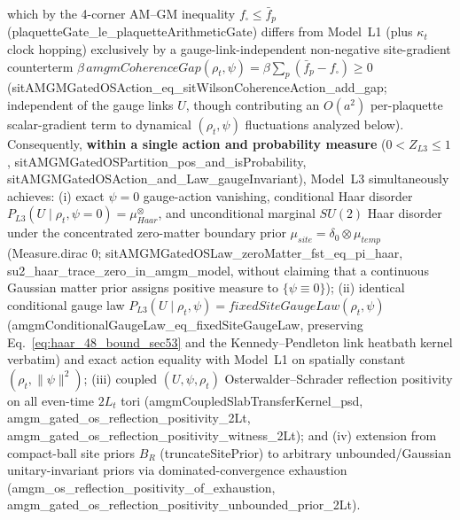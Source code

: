 \documentclass[american,11pt,letterpaper]{article}
\def\mathrm#1{#1}%
\def\texttt#1{#1}%
\begin{document}
\begin{enumerate}[leftmargin=2em]
  which by the 4-corner AM--GM inequality $f_\square \le \bar{f}_p$ (\texttt{plaquette\allowbreak{}Gate\_\allowbreak{}le\_\allowbreak{}plaquette\allowbreak{}Arithmetic\allowbreak{}Gate}) differs from Model~L1 (plus $\kappa_t$ clock hopping) exclusively by a gauge-link-independent non-negative site-gradient counterterm $\beta\,\mathrm{amgmCoherenceGap}(\rho_t,\psi) = \beta\sum_p(\bar{f}_p - f_\square) \ge 0$ (\texttt{sit\allowbreak{}AMGMGated\allowbreak{}OSAction\_\allowbreak{}eq\_\allowbreak{}sit\allowbreak{}Wilson\allowbreak{}Coherence\allowbreak{}Action\_\allowbreak{}add\_\allowbreak{}gap}; independent of the gauge links $U$, though contributing an $O(a^2)$ per-plaquette scalar-gradient term to dynamical $(\rho_t,\psi)$ fluctuations analyzed below). Consequently, \textbf{within a single action and probability measure} ($0 < Z_{\mathrm{L3}} \le 1$, \texttt{sit\allowbreak{}AMGMGated\allowbreak{}OSPartition\_\allowbreak{}pos\_\allowbreak{}and\_\allowbreak{}is\allowbreak{}Probability}, \texttt{sit\allowbreak{}AMGMGated\allowbreak{}OSAction\_\allowbreak{}and\_\allowbreak{}Law\_\allowbreak{}gauge\allowbreak{}Invariant}), Model~L3 simultaneously achieves: (i) exact $\psi = 0$ gauge-action vanishing, conditional Haar disorder $P_{\mathrm{L3}}(U\mid\rho_t,\psi=0) = \mu_{\mathrm{Haar}}^{\otimes}$, and unconditional marginal $SU(2)$ Haar disorder under the concentrated zero-matter boundary prior $\mu_{\mathrm{site}} = \delta_0 \otimes \mu_{\mathrm{temp}}$ (\texttt{Measure.dirac 0}; \texttt{sit\allowbreak{}AMGMGated\allowbreak{}OSLaw\_\allowbreak{}zero\allowbreak{}Matter\_\allowbreak{}fst\_\allowbreak{}eq\_\allowbreak{}pi\_\allowbreak{}haar}, \texttt{su2\_\allowbreak{}haar\_\allowbreak{}trace\_\allowbreak{}zero\_\allowbreak{}in\_\allowbreak{}amgm\_\allowbreak{}model}, without claiming that a continuous Gaussian matter prior assigns positive measure to $\{\psi \equiv 0\}$); (ii) identical conditional gauge law $P_{\mathrm{L3}}(U\mid\rho_t,\psi) = \mathrm{fixedSiteGaugeLaw}(\rho_t,\psi)$ (\texttt{amgm\allowbreak{}Conditional\allowbreak{}Gauge\allowbreak{}Law\_\allowbreak{}eq\_\allowbreak{}fixed\allowbreak{}Site\allowbreak{}Gauge\allowbreak{}Law}, preserving Eq.~\eqref{eq:haar_48_bound_sec53} and the Kennedy--Pendleton link heatbath kernel verbatim) and exact action equality with Model~L1 on spatially constant $(\rho_t,\|\psi\|^2)$; (iii) coupled $(U,\psi,\rho_t)$ Osterwalder--Schrader reflection positivity on all even-time $2L_t$ tori (\texttt{amgm\allowbreak{}Coupled\allowbreak{}Slab\allowbreak{}Transfer\allowbreak{}Kernel\_\allowbreak{}psd}, \texttt{amgm\_\allowbreak{}gated\_\allowbreak{}os\_\allowbreak{}reflection\_\allowbreak{}positivity\_\allowbreak{}2\allowbreak{}Lt}, \texttt{amgm\_\allowbreak{}gated\_\allowbreak{}os\_\allowbreak{}reflection\_\allowbreak{}positivity\_\allowbreak{}witness\_\allowbreak{}2\allowbreak{}Lt}); and (iv) extension from compact-ball site priors $B_R$ (\texttt{truncateSitePrior}) to arbitrary unbounded/Gaussian unitary-invariant priors via dominated-convergence exhaustion (\texttt{amgm\_\allowbreak{}os\_\allowbreak{}reflection\_\allowbreak{}positivity\_\allowbreak{}of\_\allowbreak{}exhaustion}, \texttt{amgm\_\allowbreak{}gated\_\allowbreak{}os\_\allowbreak{}reflection\_\allowbreak{}positivity\_\allowbreak{}unbounded\_\allowbreak{}prior\_\allowbreak{}2\allowbreak{}Lt}).

\end{enumerate}
\end{document}
